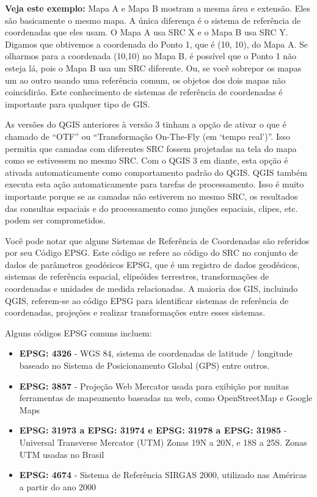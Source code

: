 \documentclass[
]{book}
\providecommand{\tightlist}{%
  \setlength{\itemsep}{0pt}\setlength{\parskip}{0pt}}
\begin{document}
\textbf{Veja este exemplo:} Mapa A e Mapa B mostram a mesma área e extensão. Eles são basicamente o mesmo mapa. A única diferença é o sistema de referência de coordenadas que eles usam. O Mapa A usa SRC X e o Mapa B usa SRC Y. Digamos que obtivemos a coordenada do Ponto 1, que é (10, 10), do Mapa A. Se olharmos para a coordenada (10,10) no Mapa B, é possível que o Ponto 1 não esteja lá, pois o Mapa B usa um SRC diferente. Ou, se você sobrepor os mapas um ao outro usando uma referência comum, os objetos dos dois mapas não coincidirão. Este conhecimento de sistemas de referência de coordenadas é importante para qualquer tipo de GIS.

As versões do QGIS anteriores à versão 3 tinham a opção de ativar o que é chamado de ``OTF'' ou ``Transformação On-The-Fly (em `tempo real')''. Isso permitia que camadas com diferentes SRC fossem projetadas na tela do mapa como se estivessem no mesmo SRC. Com o QGIS 3 em diante, esta opção é ativada automaticamente como comportamento padrão do QGIS. QGIS também executa esta ação automaticamente para tarefas de processamento. Isso é muito importante porque se as camadas não estiverem no mesmo SRC, os resultados das consultas espaciais e do processamento como junções espaciais, clipes, etc. podem ser comprometidos.

Você pode notar que alguns Sistemas de Referência de Coordenadas são referidos por seu Código EPSG. Este código se refere ao código do SRC no conjunto de dados de parâmetros geodésicos EPSG, que é um registro de dados geodésicos, sistemas de referência espacial, elipsóides terrestres, transformações de coordenadas e unidades de medida relacionadas. A maioria dos GIS, incluindo QGIS, referem-se ao código EPSG para identificar sistemas de referência de coordenadas, projeções e realizar transformações entre esses sistemas.

Alguns códigos EPSG comuns incluem:

\begin{itemize}
\tightlist
\item
  \textbf{EPSG: 4326} - WGS 84, sistema de coordenadas de latitude / longitude baseado no Sistema de Posicionamento Global (GPS) entre outros.
\item
  \textbf{EPSG: 3857} - Projeção Web Mercator usada para exibição por muitas ferramentas de mapeamento baseadas na web, como OpenStreetMap e Google Maps
\item
  \textbf{EPSG: 31973 a EPSG: 31974 e EPSG: 31978 a EPSG: 31985} - Universal Transverse Mercator (UTM) Zonas 19N a 20N, e 18S a 25S. Zonas UTM usadas no Brasil
\item
  \textbf{EPSG: 4674} - Sistema de Referência SIRGAS 2000, utilizado nas Américas a partir do ano 2000
\end{itemize}
\end{document}
